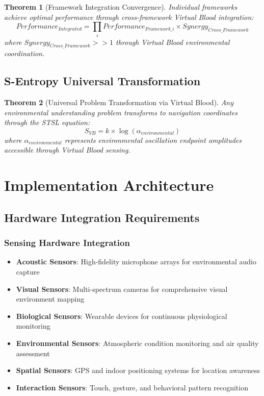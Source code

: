 \documentclass[12pt,a4paper]{article}
\newtheorem{theorem}{Theorem}
\begin{document}
\begin{theorem}[Framework Integration Convergence]
Individual frameworks achieve optimal performance through cross-framework Virtual Blood integration:
\begin{equation}
Performance_{Integrated} = \prod_{i} Performance_{Framework\_i} \times Synergy_{Cross\_Framework}
\end{equation}
where $Synergy_{Cross\_Framework} >> 1$ through Virtual Blood environmental coordination.
\end{theorem}

\subsection{S-Entropy Universal Transformation}

\begin{theorem}[Universal Problem Transformation via Virtual Blood]
Any environmental understanding problem transforms to navigation coordinates through the STSL equation:
\begin{equation}
S_{VB} = k \times \log(\alpha_{environmental})
\end{equation}
where $\alpha_{environmental}$ represents environmental oscillation endpoint amplitudes accessible through Virtual Blood sensing.
\end{theorem}

\section{Implementation Architecture}

\subsection{Hardware Integration Requirements}

\subsubsection{Sensing Hardware Integration}
\begin{itemize}
\item \textbf{Acoustic Sensors}: High-fidelity microphone arrays for environmental audio capture
\item \textbf{Visual Sensors}: Multi-spectrum cameras for comprehensive visual environment mapping
\item \textbf{Biological Sensors}: Wearable devices for continuous physiological monitoring
\item \textbf{Environmental Sensors}: Atmospheric condition monitoring and air quality assessment
\item \textbf{Spatial Sensors}: GPS and indoor positioning systems for location awareness
\item \textbf{Interaction Sensors}: Touch, gesture, and behavioral pattern recognition
\end{itemize}
\end{document}
